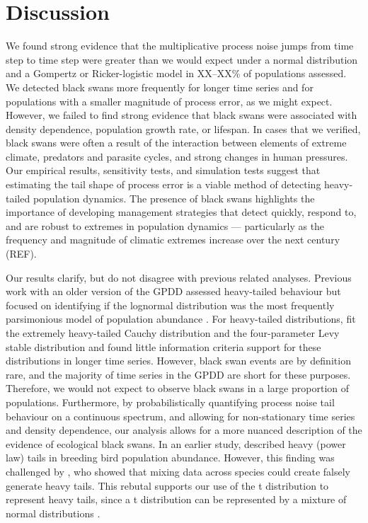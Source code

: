 \section{Discussion}

We found strong evidence that the multiplicative process noise jumps from time step to time step were greater than we would expect under a normal distribution and a Gompertz or Ricker-logistic model in XX--XX\% of populations assessed. We detected black swans more frequently for longer time series and for populations with a smaller magnitude of process error, as we might expect. However, we failed to find strong evidence that black swans were associated with density dependence, population growth rate, or lifespan. In cases that we verified, black swans were often a result of the interaction between elements of extreme climate, predators and parasite cycles, and strong changes in human pressures. Our empirical results, sensitivity tests, and simulation tests suggest that estimating the tail shape of process error is a viable method of detecting heavy-tailed population dynamics. The presence of black swans highlights the importance of developing management strategies that detect quickly, respond to, and are robust to extremes in population dynamics --- particularly as the frequency and magnitude of climatic extremes increase over the next century (REF).

Our results clarify, but do not disagree with previous related analyses. Previous work with an older version of the GPDD assessed heavy-tailed behaviour but focused on identifying if the lognormal distribution was the most frequently parsimonious model of population abundance \citep{halley2002}. For heavy-tailed distributions, \citet{halley2002} fit the extremely heavy-tailed Cauchy distribution and the four-parameter Levy stable distribution and found little information criteria support for these distributions in longer time series. However, black swan events are by definition rare, and the majority of time series in the GPDD are short for these purposes. Therefore, we would not expect to observe black swans in a large proportion of populations. Furthermore, by probabilistically quantifying process noise tail behaviour on a continuous spectrum, and allowing for non-stationary time series and density dependence, our analysis allows for a more nuanced description of the evidence of ecological black swans. In an earlier study, \citet{keitt1998} described heavy (power law) tails in breeding bird population abundance. However, this finding was challenged by \citet{allen2001}, who showed that mixing data across species could create falsely generate heavy tails. This rebutal supports our use of the t distribution to represent heavy tails, since a t distribution can be represented by a mixture of normal distributions \citep[with inverse-gamma-distributed variances,][]{gelman2014}.

